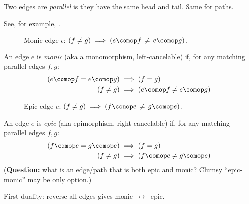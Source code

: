 \documentclass[11pt,openany]{book}
\begin{document}
\label{sec:monic_epic_isic}

Two edges are \textit{parallel} is they have the same head and tail.
Same for paths.


See, for example, \cite{perrone_2019_cath_notes}.

\begin{figure}
\centering
{}
\caption{Monic edge $e$: 
$\left( f \neq g \right) 
\implies 
\left( e \comop f \, \neq \, e \comop g \right)$.}
\label{fig:monic}
\end{figure}

An edge $e$ is \textit{monic} (aka a monomorphism, left-cancelable)
if, for any matching parallel edges $f,g$:
\begin{align*}
\left( e \comop f = e \comop g \right) 
& 
\implies 
\left( f = g \right) 
\\
\left( f \neq g \right) 
&
\implies 
\left( e \comop f \neq e \comop g \right) 
\end{align*}

\begin{figure}
\centering
{}
\caption{Epic edge $e$: 
$\left( f \neq g \right)
 \implies 
 \left( f \comop e \, \neq \, g \comop e \right)$.}
\label{fig:epic}
\end{figure}

An edge $e$ is \textit{epic} (aka epimorphism, right-cancelable)
if, for any matching parallel edges $f,g$:
\begin{align*}
\left( f \comop e = g \comop e \right) 
& 
\implies 
\left( f = g \right)
\\
\left( f \neq g \right)
& 
\implies 
\left( f \comop e \neq g \comop e \right) 
\end{align*}
(\textbf{Question:} 
what is an edge/path that is both epic and monic?
Clumsy ``epic-monic'' may be only option.)

First duality: reverse all edges gives monic $\,\leftrightarrow\,$ epic.
\end{document}
